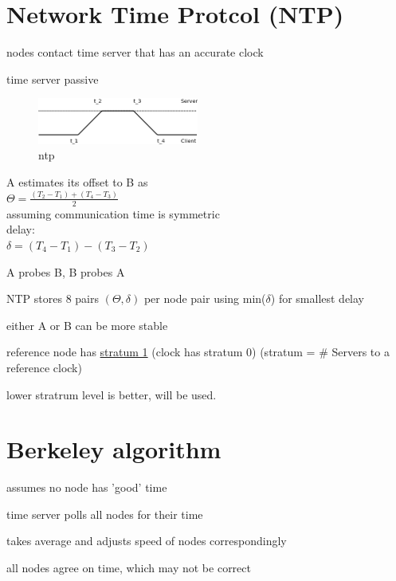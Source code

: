 \documentclass[ngerman,a4paper]{report}
\begin{document}
\section{Network Time Protcol (NTP)}
\begin{compactitem}
\item nodes contact time server that has an accurate clock
\item time server passive\\

\begin{figure}[h]
	\centering
	\includegraphics[width=200px]{gfx/ntp.png}
	\caption{ntp}
	\label{img:ntp}
\end{figure}

A estimates its offset to B as\\
$\Theta = \frac{(T_2 - T_1) + (T_4 - T_3)}{2}$\\
assuming communication time is symmetric\\
delay:\\
$\delta = (T_4 - T_1) - (T_3 - T_2)$
\item A probes B, B probes A
\item NTP stores 8 pairs $(\Theta, \delta)$ per node pair using min($\delta$) for smallest delay
\item either A or B can be more stable
\item reference node has \underline{stratum  1} (clock has stratum 0) (stratum = \# Servers to a reference clock)
\item lower stratrum level is better, will be used.
\end{compactitem}

\section{Berkeley algorithm}
\begin{compactitem}
\item assumes no node has 'good' time
\item time server polls all nodes for their time
\item takes average and adjusts speed of nodes correspondingly
\item all nodes agree on time, which may not be correct
\end{compactitem}
\end{document}
